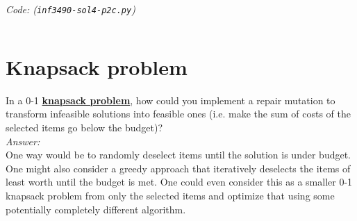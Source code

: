 \documentclass{article}           %
\begin{document}
\textit{Code: (\texttt{inf3490-sol4-p2c.py})}\\
\inputminted{Python}{inf3490-sol4-p2c.py}

\section{Knapsack problem}
In a 0-1 \href{https://en.wikipedia.org/wiki/Knapsack_problem}{\textbf{knapsack problem}},
how could you implement a repair mutation to transform infeasible solutions into feasible ones
(i.e. make the sum of costs of the selected items go below the budget)?\\

\textit{Answer:}\\

One way would be to randomly deselect items until the solution is under budget.
One might also consider a greedy approach that iteratively deselects the items of
least worth until the budget is met. One could even consider this as a smaller
0-1 knapsack problem from only the selected items and optimize that using some
potentially completely different algorithm.


\end{document}
